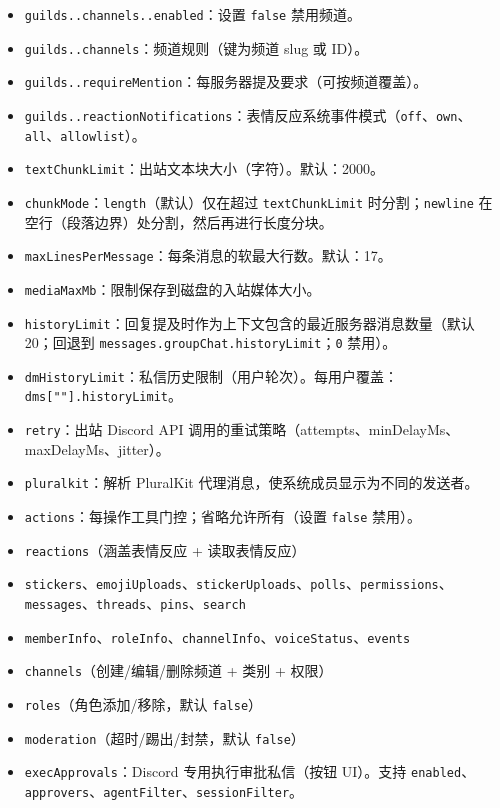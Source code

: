 \begin{itemize}
  \item \texttt{guilds..channels..enabled}：设置 \texttt{false} 禁用频道。
  \item \texttt{guilds..channels}：频道规则（键为频道 slug 或 ID）。
  \item \texttt{guilds..requireMention}：每服务器提及要求（可按频道覆盖）。
  \item \texttt{guilds..reactionNotifications}：表情反应系统事件模式（\texttt{off}、\texttt{own}、\texttt{all}、\texttt{allowlist}）。
  \item \texttt{textChunkLimit}：出站文本块大小（字符）。默认：2000。
  \item \texttt{chunkMode}：\texttt{length}（默认）仅在超过 \texttt{textChunkLimit} 时分割；\texttt{newline} 在空行（段落边界）处分割，然后再进行长度分块。
  \item \texttt{maxLinesPerMessage}：每条消息的软最大行数。默认：17。
  \item \texttt{mediaMaxMb}：限制保存到磁盘的入站媒体大小。
  \item \texttt{historyLimit}：回复提及时作为上下文包含的最近服务器消息数量（默认 20；回退到 \texttt{messages.groupChat.historyLimit}；\texttt{0} 禁用）。
  \item \texttt{dmHistoryLimit}：私信历史限制（用户轮次）。每用户覆盖：\texttt{dms[""].historyLimit}。
  \item \texttt{retry}：出站 Discord API 调用的重试策略（attempts、minDelayMs、maxDelayMs、jitter）。
  \item \texttt{pluralkit}：解析 PluralKit 代理消息，使系统成员显示为不同的发送者。
  \item \texttt{actions}：每操作工具门控；省略允许所有（设置 \texttt{false} 禁用）。
  \item \texttt{reactions}（涵盖表情反应 + 读取表情反应）
  \item \texttt{stickers}、\texttt{emojiUploads}、\texttt{stickerUploads}、\texttt{polls}、\texttt{permissions}、\texttt{messages}、\texttt{threads}、\texttt{pins}、\texttt{search}
  \item \texttt{memberInfo}、\texttt{roleInfo}、\texttt{channelInfo}、\texttt{voiceStatus}、\texttt{events}
  \item \texttt{channels}（创建/编辑/删除频道 + 类别 + 权限）
  \item \texttt{roles}（角色添加/移除，默认 \texttt{false}）
  \item \texttt{moderation}（超时/踢出/封禁，默认 \texttt{false}）
  \item \texttt{execApprovals}：Discord 专用执行审批私信（按钮 UI）。支持 \texttt{enabled}、\texttt{approvers}、\texttt{agentFilter}、\texttt{sessionFilter}。
\end{itemize}


